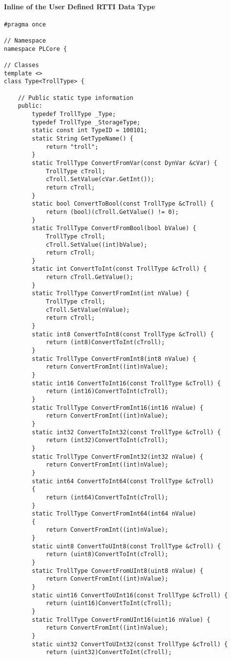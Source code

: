 \paragraph{Inline of the User Defined \ac{RTTI} Data Type}
\begin{lstlisting}[label=Code:UserDefinedRTTIDataTypeInline,caption={Inline of the user defined \ac{RTTI} data type}]
#pragma once

// Namespace
namespace PLCore {

// Classes
template <>
class Type<TrollType> {

	// Public static type information
	public:
		typedef TrollType _Type;
		typedef TrollType _StorageType;
		static const int TypeID = 100101;
		static String GetTypeName() {
			return "troll";
		}
		static TrollType ConvertFromVar(const DynVar &cVar) {
			TrollType cTroll;
			cTroll.SetValue(cVar.GetInt());
			return cTroll;
		}
		static bool ConvertToBool(const TrollType &cTroll) {
			return (bool)(cTroll.GetValue() != 0);
		}
		static TrollType ConvertFromBool(bool bValue) {
			TrollType cTroll;
			cTroll.SetValue((int)bValue);
			return cTroll;
		}
		static int ConvertToInt(const TrollType &cTroll) {
			return cTroll.GetValue();
		}
		static TrollType ConvertFromInt(int nValue) {
			TrollType cTroll;
			cTroll.SetValue(nValue);
			return cTroll;
		}
		static int8 ConvertToInt8(const TrollType &cTroll) {
			return (int8)ConvertToInt(cTroll);
		}
		static TrollType ConvertFromInt8(int8 nValue) {
			return ConvertFromInt((int)nValue);
		}
		static int16 ConvertToInt16(const TrollType &cTroll) {
			return (int16)ConvertToInt(cTroll);
		}
		static TrollType ConvertFromInt16(int16 nValue) {
			return ConvertFromInt((int)nValue);
		}
		static int32 ConvertToInt32(const TrollType &cTroll) {
			return (int32)ConvertToInt(cTroll);
		}
		static TrollType ConvertFromInt32(int32 nValue) {
			return ConvertFromInt((int)nValue);
		}
		static int64 ConvertToInt64(const TrollType &cTroll)
		{
			return (int64)ConvertToInt(cTroll);
		}
		static TrollType ConvertFromInt64(int64 nValue)
		{
			return ConvertFromInt((int)nValue);
		}
		static uint8 ConvertToUInt8(const TrollType &cTroll) {
			return (uint8)ConvertToInt(cTroll);
		}
		static TrollType ConvertFromUInt8(uint8 nValue) {
			return ConvertFromInt((int)nValue);
		}
		static uint16 ConvertToUInt16(const TrollType &cTroll) {
			return (uint16)ConvertToInt(cTroll);
		}
		static TrollType ConvertFromUInt16(uint16 nValue) {
			return ConvertFromInt((int)nValue);
		}
		static uint32 ConvertToUInt32(const TrollType &cTroll) {
			return (uint32)ConvertToInt(cTroll);

\end{lstlisting}
